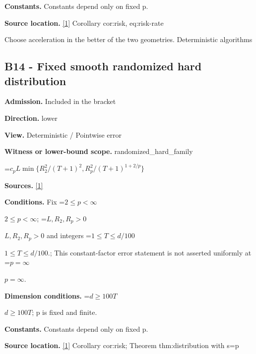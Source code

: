 \documentclass[10pt,a4paper]{article}
\newcommand{\AtlasMath}[1]{\par\begingroup\centering\setbox0=\hbox{$\displaystyle #1$}\ifdim\wd0>1.4\linewidth\typeout{ATLAS WIDE FORMULA: \the\wd0}\fi\ifdim\wd0>\linewidth\resizebox{\linewidth}{!}{\box0}\else\box0\fi\par\endgroup}
\newcommand{\AtlasInlineMath}[1]{\begingroup\setbox0=\hbox{$#1$}\ifdim\wd0>.4\linewidth\endgroup\AtlasMath{#1}\else\endgroup$#1$\fi}
\begin{document}
\textbf{Constants.} Constants depend only on fixed p.



\textbf{Source location.} \href{https://github.com/WU-Wendao/Colombo/blob/main/colombo_sensorium/Complexity_altas/data/sources/colombo/U02/manuscript.pdf}{[1]} Corollary cor:risk, eq:risk-rate



Choose acceleration in the better of the two geometries. Deterministic algorithms



\subsection{B14 - Fixed smooth randomized hard distribution}


\textbf{Admission.} Included in the bracket



\textbf{Direction.} lower



\textbf{View.} Deterministic / Pointwise error



\textbf{Witness or lower-bound scope.} randomized\_hard\_family



\AtlasMath{c_pL\min\{R_2^2/(T+1)^2,R_p^2/(T+1)^{1+2/p}\}}


\textbf{Sources.} \href{https://github.com/WU-Wendao/Colombo/blob/main/colombo_sensorium/Complexity_altas/data/sources/colombo/U02/manuscript.pdf}{[1]}



\textbf{Conditions.} Fix \AtlasInlineMath{2\le p<\infty}; \AtlasInlineMath{L,R_2,R_p>0} and integers \AtlasInlineMath{1\le T\le d/100}.; This constant-factor error statement is not asserted uniformly at \AtlasInlineMath{p=\infty}.



\textbf{Dimension conditions.} \AtlasInlineMath{d\ge100T}; p is fixed and finite.



\textbf{Constants.} Constants depend only on fixed p.



\textbf{Source location.} \href{https://github.com/WU-Wendao/Colombo/blob/main/colombo_sensorium/Complexity_altas/data/sources/colombo/U02/manuscript.pdf}{[1]} Corollary cor:risk; Theorem thm:distribution with s=p
\end{document}

